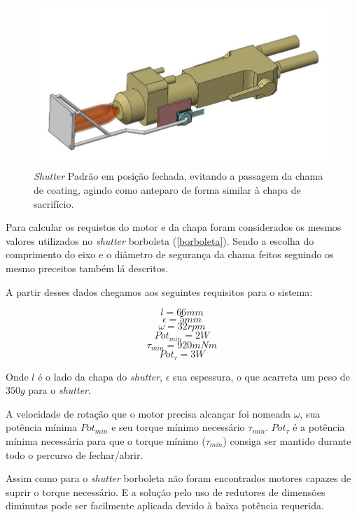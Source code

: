 \begin{figure}[h!]
\centering
	\includegraphics[width=\columnwidth]{figs/estudo/shutter/Padrao_fechado}
	\caption{\textit{Shutter} Padrão em posição fechada, evitando a passagem da
	chama de coating, agindo como anteparo de forma similar à chapa de sacrifício.}
	\label{fig::padrao_fechado}
\end{figure}

Para calcular os requistos do motor e da chapa foram considerados os mesmos
valores utilizados no \textit{shutter} borboleta (\ref{borboleta}). Sendo a
escolha do comprimento do eixo e o diâmetro de segurança da chama feitos
seguindo os mesmo preceitos também lá descritos.

A partir desses dados chegamos aos seguintes requisitos para o sistema:

\[ l = 66 mm\]
\[ \epsilon = 5 mm\]
\[ \omega = 32 rpm\]
\[ {Pot}_{min} = 2 W \]
\[ \tau_{min} = 920 mNm \]
\[ Pot_{\tau} = 3 W \]


Onde $l$ é o lado da chapa do \textit{shutter}, $\epsilon$ sua espessura, o que
acarreta um peso de $350 g$ para o \textit{shutter}.

A velocidade de rotação que o motor precisa alcançar foi nomeada $\omega$, sua
potência mínima $Pot_{min}$  e seu torque mínimo necessário $\tau_{min}$.
$Pot_{\tau}$ é a potência mínima necessária para que o torque mínimo
($\tau_{min}$) consiga ser mantido durante todo o percurso de fechar/abrir.

Assim como para o \textit{shutter} borboleta não foram encontrados motores
capazes de suprir o torque necessário. E a solução pelo uso de redutores de
dimensões diminutas pode ser facilmente aplicada devido à baixa potência
requerida.
